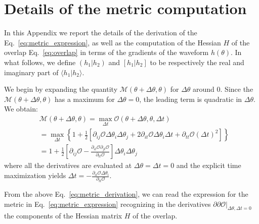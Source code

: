 \documentclass[twocolumn,showpacs,preprintnumbers,nofootinbib,prd,
superscriptaddress,10pt]{revtex4-2}
\newcommand{\scalar}[2]{\langle #1|#2 \rangle}
\newcommand{\rescalar}[2]{( #1 |#2 )}
\newcommand{\imscalar}[2]{[ #1|#2 ]}
\begin{document}
\appendix

\section{Details of the metric computation}\label{app:metric}

In this Appendix we report the details of the derivation of the Eq.~\eqref{eq:metric_expression}, as well as the computation of the Hessian $H$ of the overlap Eq.~\eqref{eq:overlap} in terms of the gradients of the waveform $h(\theta)$. 
In what follows, we define $\rescalar{h_1}{h_2}$ and $\imscalar{h_1}{h_2}$ to be respectively the real and imaginary part of $\scalar{h_1}{h_2}$.

We begin by expanding the quantity $\mathcal{M}(\theta+\Delta\theta,\theta )$ for $\Delta\theta$ around $0$. Since the $\mathcal{M}(\theta+\Delta\theta,\theta )$ has a maximum for $\Delta\theta = 0$, the leading term is quadratic in $\Delta\theta$.
We obtain:
\begin{align} \label{eq:metric_derivation}
	&\mathcal{M}(\theta+\Delta\theta,\theta ) = \max_{\Delta t} \mathcal{O}(\theta + \Delta\theta, \theta, \Delta t) \nonumber\\
	& =	\max_{\Delta t} \left\{ 1+ \frac{1}{2}\left[ \partial_{ij}\mathcal{O} \Delta\theta_i \Delta\theta_j + 2  \partial_{it}\mathcal{O} \Delta\theta_i \Delta t + \partial_{tt}\mathcal{O} (\Delta t)^2 \right] \right\}  \nonumber \\
	&= 1 + \frac{1}{2}\left[ \partial_{ij}\mathcal{O} - \frac{\partial_{it}\mathcal{O} \partial_{jt}\mathcal{O}}{\partial_{tt}\mathcal{O}}\right] \Delta\theta_i \Delta\theta_j
\end{align}
where all the derivatives are evaluated at ${\Delta\theta = \Delta t = 0}$ and the explicit time maximization yields
${\Delta t = -\frac{\partial_{it}\mathcal{O} \Delta\theta_i}{\partial_{tt}\mathcal{O}}}$.

From the above Eq.~\eqref{eq:metric_derivation}, we can read the expression for the metric in Eq.~\eqref{eq:metric_expression} recognizing in the derivatives $\partial\partial\mathcal{O}|_{\Delta\theta, \Delta t = 0}$ the components of the Hessian matrix $H$ of the overlap.
\end{document}
